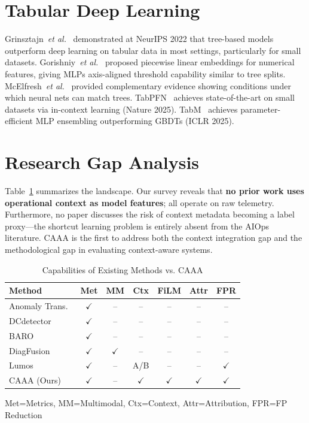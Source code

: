 \documentclass[12pt,a4paper]{report}
\newcommand{\sys}{CAAA}
\begin{document}
\section{Tabular Deep Learning}

Grinsztajn~\textit{et al.}~\cite{grinsztajn2022tree} demonstrated at NeurIPS 2022 that tree-based models outperform deep learning on tabular data in most settings, particularly for small datasets. Gorishniy~\textit{et al.}~\cite{gorishniy2022embeddings} proposed piecewise linear embeddings for numerical features, giving MLPs axis-aligned threshold capability similar to tree splits. McElfresh~\textit{et al.}~\cite{mcelfresh2023neural} provided complementary evidence showing conditions under which neural nets can match trees. TabPFN~\cite{hollmann2024tabpfn} achieves state-of-the-art on small datasets via in-context learning (Nature 2025). TabM~\cite{gorishniy2025tabm} achieves parameter-efficient MLP ensembling outperforming GBDTs (ICLR 2025).

\section{Research Gap Analysis}

Table~\ref{tab:gap} summarizes the landscape. Our survey reveals that \textbf{no prior work uses operational context as model features}; all operate on raw telemetry. Furthermore, no paper discusses the risk of context metadata becoming a label proxy---the shortcut learning problem is entirely absent from the AIOps literature. \sys{} is the first to address both the context integration gap and the methodological gap in evaluating context-aware systems.

\begin{table}[h]
    \centering
    \caption{Capabilities of Existing Methods vs. \sys{}}
    \label{tab:gap}
    \begin{tabular}{lcccccc}
        \toprule
        \textbf{Method} & \textbf{Met} & \textbf{MM} & \textbf{Ctx} & \textbf{FiLM} & \textbf{Attr} & \textbf{FPR} \\
        \midrule
        Anomaly Trans.~\cite{xu2022anomalytransformer} & $\checkmark$ & -- & -- & -- & -- & -- \\
        DCdetector~\cite{yang2023dcdetector} & $\checkmark$ & -- & -- & -- & -- & -- \\
        BARO~\cite{chen2024baro} & $\checkmark$ & -- & -- & -- & -- & -- \\
        DiagFusion~\cite{zhang2023diagfusion} & $\checkmark$ & $\checkmark$ & -- & -- & -- & -- \\
        Lumos~\cite{lumos2020} & $\checkmark$ & -- & A/B & -- & -- & $\checkmark$ \\
        \sys{} (Ours) & $\checkmark$ & -- & $\checkmark$ & $\checkmark$ & $\checkmark$ & $\checkmark$ \\
        \bottomrule
    \end{tabular}

    \smallskip
    \footnotesize Met=Metrics, MM=Multimodal, Ctx=Context, Attr=Attribution, FPR=FP Reduction
\end{table}
\end{document}
